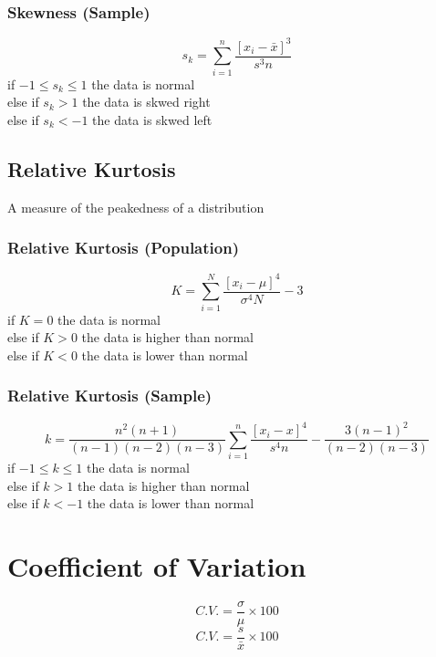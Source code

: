 \documentclass[twocolumn]{article}
\begin{document}
    \subsubsection{Skewness (Sample)}
    \begin{equation}
        s_{k} = \sum_{i=1}^{n}\frac{[x_{i} - \bar{x}]^{3}}{s^{3}n}
    \end{equation}
    if $-1 \leq s_{k} \leq 1$ the data is normal\\
    else if $s_{k} > 1$ the data is skwed right\\
    else if $s_{k} < -1$ the data is skwed left
    \subsection{Relative Kurtosis}
    A measure of the peakedness of a distribution
    \subsubsection{Relative Kurtosis (Population)}
    \begin{equation}
        K = \sum_{i=1}^{N}\frac{[x_{i} - \mu]^{4}}{\sigma^{4}N} - 3
    \end{equation}
    if $K = 0$ the data is normal\\
    else if $K > 0$ the data is higher than normal\\
    else if $K < 0$ the data is lower than normal
    \subsubsection{Relative Kurtosis (Sample)}
    \tiny
    \begin{equation}
        k = \frac{n^{2}(n+1)}{(n-1)(n-2)(n-3)} \sum_{i=1}^{n}\frac{[x_{i}-x]^{4}}{s^{4}n}-\frac{3(n-1)^{2}}{(n-2)(n-3)}
    \end{equation}
    \normalsize
    if $-1 \leq k \leq 1$ the data is normal\\
    else if $k > 1$ the data is higher than normal\\
    else if $k < -1$ the data is lower than normal
    \section{Coefficient of Variation}
    \begin{equation}
        C.V. = \frac{\sigma}{\mu} \times 100 %
    \end{equation}
    \begin{equation}
        C.V. = \frac{s}{\bar{x}} \times 100 %
    \end{equation}
\end{document}
